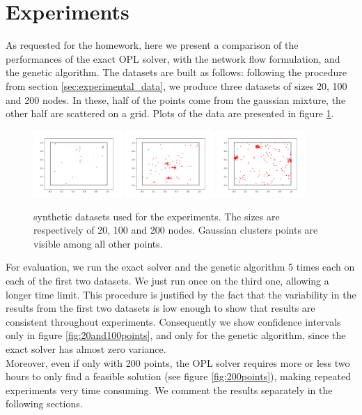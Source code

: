 \documentclass{article}
\begin{document}
\section{Experiments}\label{sec:experiments}
As requested for the homework, here we present a comparison of the performances of the exact OPL solver, with the network flow formulation, and the genetic algorithm. The datasets are built as follows: following the procedure from section \ref{sec:experimental_data}, we produce three datasets of sizes 20, 100 and 200 nodes. In these, half of the points come from the gaussian mixture, the other half are scattered on a grid. Plots of the data are presented in figure \ref{fig:datasets}.

\begin{figure}
    \centering
    \includegraphics[width=0.3\textwidth]{pics/experimental_data_20.png}
   \includegraphics[width=0.3\textwidth]{pics/experimental_data_100.png} 
   \includegraphics[width=0.3\textwidth]{pics/experimental_data_200.png}
    \caption{synthetic datasets used for the experiments. The sizes are respectively of 20, 100 and 200 nodes. Gaussian clusters points are visible among all other points.}
    \label{fig:datasets}
\end{figure}

For evaluation, we run the exact solver and the genetic algorithm 5 times each on each of the first two datasets. We just run once on the third one, allowing a longer time limit. This procedure is justified by the fact that the variability in the results from the first two datasets is low enough to show that results are consistent throughout experiments. Consequently we show confidence intervals only in figure \ref{fig:20and100points}, and only for the genetic algorithm, since the exact solver has almost zero variance. \\
Moreover, even if only with 200 points, the OPL solver requires more or less two hours to only find a feasible solution (see figure \ref{fig:200points}), making repeated experiments very time consuming. We comment the results separately in the following sections.
\end{document}
